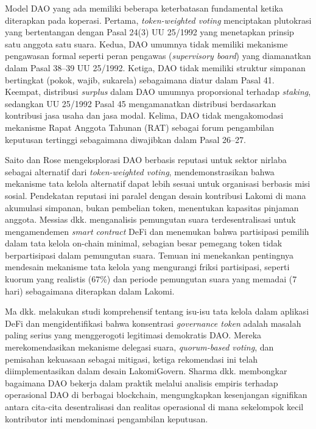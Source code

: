 Model DAO yang ada memiliki beberapa keterbatasan fundamental ketika diterapkan pada koperasi. Pertama, \textit{token-weighted voting} menciptakan plutokrasi yang bertentangan dengan Pasal 24(3) UU 25/1992 yang menetapkan prinsip satu anggota satu suara. Kedua, DAO umumnya tidak memiliki mekanisme pengawasan formal seperti peran pengawas (\textit{supervisory board}) yang diamanatkan dalam Pasal 38--39 UU 25/1992. Ketiga, DAO tidak memiliki struktur simpanan bertingkat (pokok, wajib, sukarela) sebagaimana diatur dalam Pasal 41. Keempat, distribusi \textit{surplus} dalam DAO umumnya proporsional terhadap \textit{staking}, sedangkan UU 25/1992 Pasal 45 mengamanatkan distribusi berdasarkan kontribusi jasa usaha dan jasa modal. Kelima, DAO tidak mengakomodasi mekanisme Rapat Anggota Tahunan (RAT) sebagai forum pengambilan keputusan tertinggi sebagaimana diwajibkan dalam Pasal 26--27.

Saito dan Rose \cite{saito2023reputation} mengeksplorasi DAO berbasis reputasi untuk sektor nirlaba sebagai alternatif dari \textit{token-weighted voting}, mendemonstrasikan bahwa mekanisme tata kelola alternatif dapat lebih sesuai untuk organisasi berbasis misi sosial. Pendekatan reputasi ini paralel dengan desain kontribusi Lakomi di mana akumulasi simpanan, bukan pembelian token, menentukan kapasitas pinjaman anggota. Messias dkk. \cite{messias2023understanding} menganalisis pemungutan suara terdesentralisasi untuk mengamendemen \textit{smart contract} DeFi dan menemukan bahwa partisipasi pemilih dalam tata kelola on-chain minimal, sebagian besar pemegang token tidak berpartisipasi dalam pemungutan suara. Temuan ini menekankan pentingnya mendesain mekanisme tata kelola yang mengurangi friksi partisipasi, seperti kuorum yang realistis (67\%) dan periode pemungutan suara yang memadai (7 hari) sebagaimana diterapkan dalam Lakomi.

Ma dkk. \cite{ma2023comprehensive} melakukan studi komprehensif tentang isu-isu tata kelola dalam aplikasi DeFi dan mengidentifikasi bahwa konsentrasi \textit{governance token} adalah masalah paling serius yang menggerogoti legitimasi demokratis DAO. Mereka merekomendasikan mekanisme delegasi suara, \textit{quorum-based voting}, dan pemisahan kekuasaan sebagai mitigasi, ketiga rekomendasi ini telah diimplementasikan dalam desain LakomiGovern. Sharma dkk. \cite{sharma2023unpacking} membongkar bagaimana DAO bekerja dalam praktik melalui analisis empiris terhadap operasional DAO di berbagai blockchain, mengungkapkan kesenjangan signifikan antara cita-cita desentralisasi dan realitas operasional di mana sekelompok kecil kontributor inti mendominasi pengambilan keputusan.

